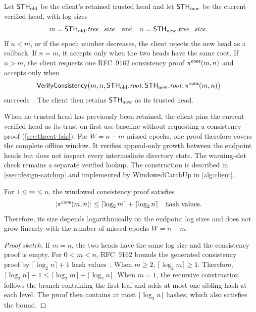 \begin{definition}\label{def:windowed}
Let $\mathsf{STH}_{\mathrm{old}}$ be the client's retained trusted head and let
$\mathsf{STH}_{\mathrm{new}}$ be the current verified head, with log sizes
\[
m=\mathsf{STH}_{\mathrm{old}}.\mathit{tree\_size}
\quad\text{and}\quad
n=\mathsf{STH}_{\mathrm{new}}.\mathit{tree\_size}.
\]
If $n<m$, or if the epoch number decreases, the client rejects the new head as a rollback. If
$n=m$, it accepts only when the two heads have the same root. If $n>m$, the client requests one
RFC~9162 consistency proof $\pi^{\mathsf{cons}}(m,n)$ and accepts only when
\[
\textsf{VerifyConsistency}
\bigl(m,n,\mathsf{STH}_{\mathrm{old}}.\mathit{root},
\mathsf{STH}_{\mathrm{new}}.\mathit{root},\pi^{\mathsf{cons}}(m,n)\bigr)
\]
succeeds~\cite[Section~2.1.4]{rfc9162}. The client then retains
$\mathsf{STH}_{\mathrm{new}}$ as its trusted head.

When no trusted head has previously been retained, the client pins the current verified head as its
trust-on-first-use baseline without requesting a consistency proof
(\cref{sec:threat-fair}). For $W=n-m$ missed epochs, one proof therefore covers the complete
offline window. It verifies append-only growth between the endpoint heads but does not inspect every
intermediate directory state. The warning-slot check remains a separate verified lookup. The
construction is described in \cref{ssec:design-catchup} and implemented by
\textsf{WindowedCatchUp} in \cref{alg:client}.
\end{definition}

\begin{lemma}\label{lem:windowed-size}
For $1\le m\le n$, the windowed consistency proof satisfies
\[
|\pi^{\mathsf{cons}}(m,n)|
\le
\lceil\log_2 m\rceil+\lceil\log_2 n\rceil
\quad\text{hash values}.
\]
Therefore, its size depends logarithmically on the endpoint log sizes and does not grow linearly
with the number of missed epochs $W=n-m$.
\end{lemma}

\begin{proof}[Proof sketch]
If $m=n$, the two heads have the same log size and the consistency proof is empty. For $0<m<n$,
RFC~9162 bounds the generated consistency proof by
$\lceil\log_2 n\rceil+1$ hash values~\cite[Section~2.1.4.1]{rfc9162}. When $m\ge2$,
$\lceil\log_2 m\rceil\ge1$. Therefore,
$\lceil\log_2 n\rceil+1\le
\lceil\log_2 m\rceil+\lceil\log_2 n\rceil$.
When $m=1$, the recursive construction follows the branch containing the first leaf and adds at
most one sibling hash at each level. The proof then contains at most
$\lceil\log_2 n\rceil$ hashes, which also satisfies the bound.
\end{proof}

